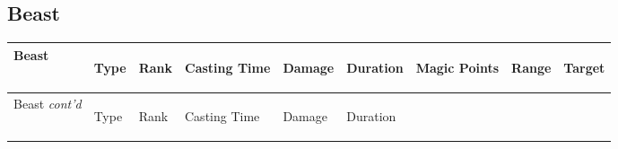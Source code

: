 \documentclass[twoside]{book}
\begin{document}
    

\subsection{Beast}
    
\begin{longtable}{p{1.25in}lp{2em}p{3em}llp{7em}ll} 
  Beast
  &
  \begin{turn}{70}{Type}\end{turn}
          
  &
  \begin{turn}{70}{Rank}\end{turn}
          
  &
  \begin{turn}{70}{Casting Time}\end{turn}
          
  &
  \begin{turn}{70}{Damage}\end{turn}
          
  &
  \begin{turn}{70}{Duration}\end{turn}
          
  &
  \begin{turn}{70}{Magic Points}\end{turn}
          
  &
  \begin{turn}{70}{Range}\end{turn}
          
  &
  \begin{turn}{70}{Target}\end{turn}
          
  \\
  \hline
  \hline
  \endfirsthead
  Beast \textit{cont'd}
        
  &
  \begin{turn}{70}{Type}\end{turn}
          
  &
  \begin{turn}{70}{Rank}\end{turn}
          
  &
  \begin{turn}{70}{Casting Time}\end{turn}
          
  &
  \begin{turn}{70}{Damage}\end{turn}
          
  &
  \begin{turn}{70}{Duration}\end{turn}
          

\end{longtable}
\end{document}
